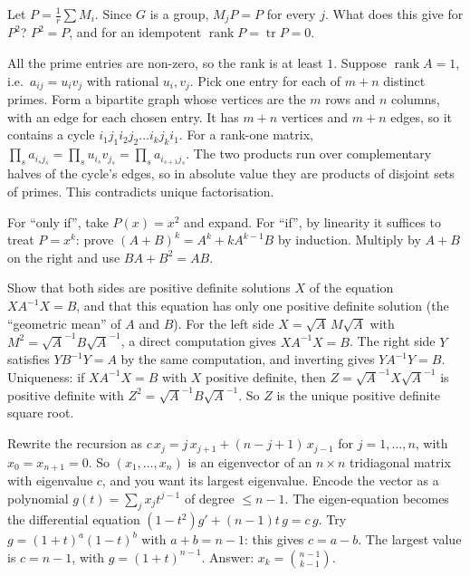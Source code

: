 \documentclass[11pt,a4paper]{article}
\begin{document}
Let \(P=\frac1r\sum M_i\). Since \(G\) is a group, \(M_jP=P\) for every \(j\). What does this give for \(P^2\)?
\(P^2=P\), and for an idempotent \(\operatorname{rank}P=\operatorname{tr}P=0\).

All the prime entries are non-zero, so the rank is at least \(1\). Suppose \(\operatorname{rank}A=1\), i.e.~\(a_{ij}=u_iv_j\) with rational \(u_i,v_j\). Pick one entry for each of \(m+n\) distinct primes.
Form a bipartite graph whose vertices are the \(m\) rows and \(n\) columns, with an edge for each chosen entry. It has \(m+n\) vertices and \(m+n\) edges, so it contains a cycle \(i_1j_1i_2j_2\dots i_kj_ki_1\).
For a rank-one matrix, \(\prod_s a_{i_sj_s}=\prod_s u_{i_s}v_{j_s}=\prod_s a_{i_{s+1}j_s}\). The two products run over complementary halves of the cycle's edges, so in absolute value they are products of disjoint sets of primes. This contradicts unique factorisation.

For ``only if'', take \(P(x)=x^2\) and expand.
For ``if'', by linearity it suffices to treat \(P=x^k\): prove \((A+B)^k=A^k+kA^{k-1}B\) by induction. Multiply by \(A+B\) on the right and use \(BA+B^2=AB\).

Show that both sides are positive definite solutions \(X\) of the equation \(XA^{-1}X=B\), and that this equation has only one positive definite solution (the ``geometric mean'' of \(A\) and \(B\)).
For the left side \(X=\sqrt A\,M\sqrt A\) with \(M^2=\sqrt A^{-1}B\sqrt A^{-1}\), a direct computation gives \(XA^{-1}X=B\). The right side \(Y\) satisfies \(YB^{-1}Y=A\) by the same computation, and inverting gives \(YA^{-1}Y=B\).
Uniqueness: if \(XA^{-1}X=B\) with \(X\) positive definite, then \(Z=\sqrt A^{-1}X\sqrt A^{-1}\) is positive definite with \(Z^2=\sqrt A^{-1}B\sqrt A^{-1}\). So \(Z\) is the unique positive definite square root.

Rewrite the recursion as \(c\,x_j=j\,x_{j+1}+(n-j+1)\,x_{j-1}\) for \(j=1,\dots,n\), with \(x_0=x_{n+1}=0\). So \((x_1,\dots,x_n)\) is an eigenvector of an \(n\times n\) tridiagonal matrix with eigenvalue \(c\), and you want its largest eigenvalue.
Encode the vector as a polynomial \(g(t)=\sum_j x_jt^{j-1}\) of degree \(\le n-1\). The eigen-equation becomes the differential equation \((1-t^2)g'+(n-1)t\,g=c\,g\).
Try \(g=(1+t)^a(1-t)^b\) with \(a+b=n-1\): this gives \(c=a-b\). The largest value is \(c=n-1\), with \(g=(1+t)^{n-1}\). Answer: \(x_k=\binom{n-1}{k-1}\).
\end{document}
